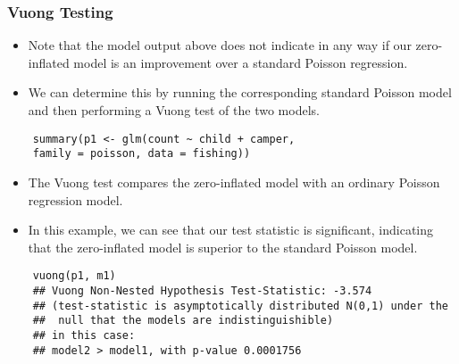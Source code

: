 \documentclass[MASTER.tex]{subfiles}
\begin{document}
\begin{frame}[fragile]
\frametitle{Vuong Testing}
	\begin{itemize}
		\item Note that the model output above does not indicate in any way if our zero-inflated model is an improvement over a standard Poisson regression. 
		\item We can determine this by running the corresponding standard Poisson model and then performing a Vuong test of the two models.
	\end{itemize}
	\begin{verbatim}
	summary(p1 <- glm(count ~ child + camper, 
	family = poisson, data = fishing))
	\end{verbatim}
\end{frame}
\begin{frame}[fragile]
	\begin{itemize}
		\item The Vuong test compares the zero-inflated model with an ordinary Poisson regression model. 
		\item In this example, we can see that our test statistic is significant, indicating that the zero-inflated model is superior to the standard Poisson model.
	\end{itemize}
\end{frame}
\begin{frame}[fragile]
	\large
	\begin{verbatim}
	vuong(p1, m1)
	## Vuong Non-Nested Hypothesis Test-Statistic: -3.574 
	## (test-statistic is asymptotically distributed N(0,1) under the
	##  null that the models are indistinguishible)
	## in this case:
	## model2 > model1, with p-value 0.0001756
	\end{verbatim}
\end{frame}
\end{document}
